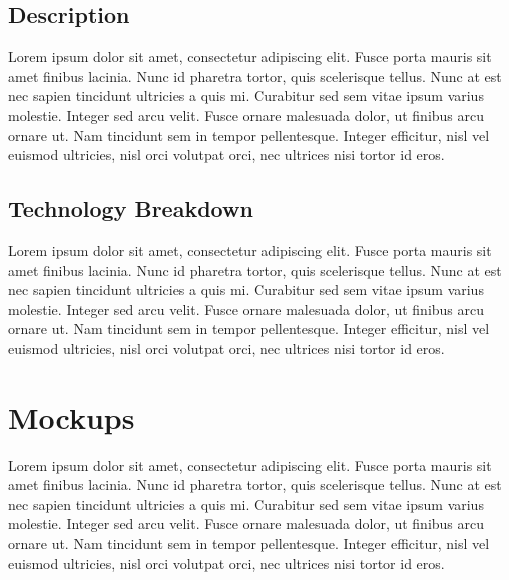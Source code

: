 \documentclass[11pt,]{article}
\begin{document}
\subsection{Description}\label{description}

Lorem ipsum dolor sit amet, consectetur adipiscing elit. Fusce porta
mauris sit amet finibus lacinia. Nunc id pharetra tortor, quis
scelerisque tellus. Nunc at est nec sapien tincidunt ultricies a quis
mi. Curabitur sed sem vitae ipsum varius molestie. Integer sed arcu
velit. Fusce ornare malesuada dolor, ut finibus arcu ornare ut. Nam
tincidunt sem in tempor pellentesque. Integer efficitur, nisl vel
euismod ultricies, nisl orci volutpat orci, nec ultrices nisi tortor id
eros.

\subsection{Technology Breakdown}\label{technology-breakdown}

Lorem ipsum dolor sit amet, consectetur adipiscing elit. Fusce porta
mauris sit amet finibus lacinia. Nunc id pharetra tortor, quis
scelerisque tellus. Nunc at est nec sapien tincidunt ultricies a quis
mi. Curabitur sed sem vitae ipsum varius molestie. Integer sed arcu
velit. Fusce ornare malesuada dolor, ut finibus arcu ornare ut. Nam
tincidunt sem in tempor pellentesque. Integer efficitur, nisl vel
euismod ultricies, nisl orci volutpat orci, nec ultrices nisi tortor id
eros.

\section{Mockups}\label{mockups}

Lorem ipsum dolor sit amet, consectetur adipiscing elit. Fusce porta
mauris sit amet finibus lacinia. Nunc id pharetra tortor, quis
scelerisque tellus. Nunc at est nec sapien tincidunt ultricies a quis
mi. Curabitur sed sem vitae ipsum varius molestie. Integer sed arcu
velit. Fusce ornare malesuada dolor, ut finibus arcu ornare ut. Nam
tincidunt sem in tempor pellentesque. Integer efficitur, nisl vel
euismod ultricies, nisl orci volutpat orci, nec ultrices nisi tortor id
eros.


\end{document}
